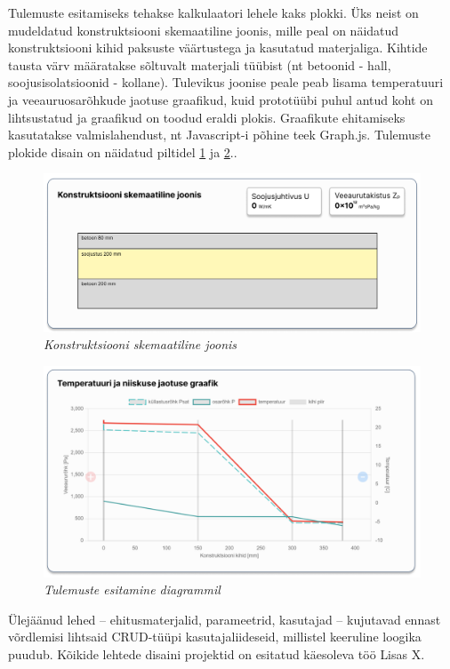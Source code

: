 Tulemuste esitamiseks tehakse kalkulaatori lehele kaks plokki. Üks neist on mudeldatud konstruktsiooni skemaatiline joonis,
mille peal on näidatud konstruktsiooni kihid paksuste väärtustega ja kasutatud materjaliga. Kihtide tausta värv määratakse
sõltuvalt materjali tüübist (nt betoonid - hall, soojusisolatsioonid - kollane). Tulevikus joonise peale peab lisama 
temperatuuri ja veeauruosarõhkude jaotuse graafikud, kuid prototüübi puhul antud koht on lihtsustatud ja graafikud
on toodud eraldi plokis. Graafikute ehitamiseks kasutatakse valmislahendust, nt Javascript-i põhine teek Graph.js.
Tulemuste plokide disain on näidatud piltidel \ref{fig:design_calc_drawing} ja \ref{fig:design_calc_graph}..

\begin{figure}[ht]
    \centering
    \includegraphics[width=.8\textwidth]{figures/analysis/desing_calc_drawing.png}
    \caption[Konstruktsiooni skemaatiline joonis]{\textit{Konstruktsiooni skemaatiline joonis}}
    \label{fig:design_calc_drawing}
\end{figure}
\begin{figure}[ht]
    \centering
    \includegraphics[width=.8\textwidth]{figures/analysis/desing_calc_graph.png}
    \caption[Tulemuste esitamine diagrammil]{\textit{Tulemuste esitamine diagrammil}}
    \label{fig:design_calc_graph}
\end{figure}

Ülejäänud lehed -- ehitusmaterjalid, parameetrid, kasutajad -- kujutavad ennast võrdlemisi lihtsaid CRUD-tüüpi kasutajaliideseid, millistel
keeruline loogika puudub. Kõikide lehtede disaini projektid on esitatud käesoleva töö \colorbox{BurntOrange}{Lisas X}.